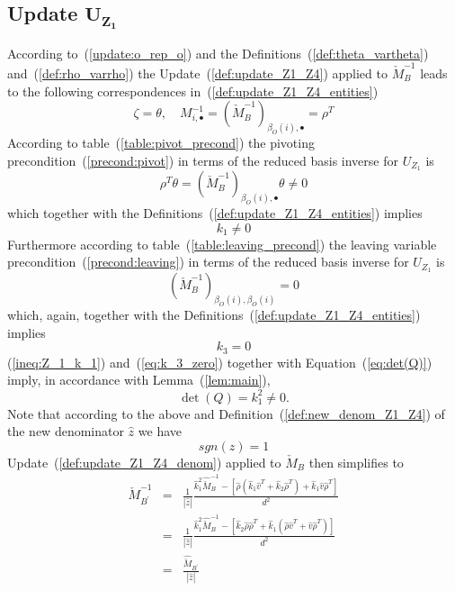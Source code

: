 \documentclass[a4paper]{article}
\begin{document}
\subsection{Update $\mathbf{U_{Z_{1}}}$}
According to~(\ref{update:o_rep_o}) and the
Definitions~(\ref{def:theta_vartheta}) 
and~(\ref{def:rho_varrho}) the
Update~(\ref{def:update_Z1_Z4}) applied to $\check{M}_{B}^{-1}$
leads to the following correspondences
in~(\ref{def:update_Z1_Z4_entities})
\begin{equation}
\zeta = \theta,
\quad
M_{i, \bullet}^{-1}
=
\left(\check{M}_{B}^{-1}\right)_{\beta_{O}(i), \bullet}
=
\rho^{T}
\end{equation}
According to table~(\ref{table:pivot_precond}) the
pivoting precondition~(\ref{precond:pivot})
in terms of the reduced basis inverse for $U_{Z_{1}}$ is
\begin{equation*}
\rho^{T}\theta
=
\left(\check{M}_{B}^{-1}\right)_{\beta_{O}(i), \bullet}\theta \neq 0
\end{equation*}
which together with the Definitions~(\ref{def:update_Z1_Z4_entities}) implies 
\begin{equation}
\label{ineq:Z_1_k_1}
k_{1} \neq 0
\end{equation}
Furthermore according to table~(\ref{table:leaving_precond})
the leaving variable precondition~(\ref{precond:leaving})
in terms of the reduced basis inverse for $U_{Z_{1}}$ is 
\begin{equation*}
\left(\check{M}_{B}^{-1}\right)_{\beta_{O}(i),\beta_{O}(i)}=0 
\end{equation*}
which, again, together with the Definitions~(\ref{def:update_Z1_Z4_entities})
implies
\begin{equation}
\label{eq:k_3_zero}
k_{3} = 0
\end{equation}
(\ref{ineq:Z_1_k_1}) and~(\ref{eq:k_3_zero}) together with
Equation~(\ref{eq:det(Q)}) imply, in accordance with Lemma~(\ref{lem:main}),  
\begin{equation}
\det(Q)=k_{1}^{2} \neq 0.
\end{equation}
Note that according to the above and
Definition~(\ref{def:new_denom_Z1_Z4}) of the new denominator
$\hat{z}$ we have
\begin{equation}
sgn(\hat{z}) = 1
\end{equation} 
Update~(\ref{def:update_Z1_Z4_denom})
applied to $\check{M}_{B}$ then simplifies to
\begin{eqnarray}
\label{def:update_Z1}
\check{M}_{B^{\prime}}^{-1}
&=&
\frac{1}{\left|\hat{z}\right|}
\frac{
\hat{k}_{1}^{2}\hat{\check{M}}_{B}^{-1}
-\left[
  \hat{\rho}
  \left(\hat{k}_{1}\hat{v}^{T} +\hat{k}_{2}\hat{\rho}^{T}\right)
  +\hat{k}_{1}\hat{v}\hat{\rho}^{T}
 \right]
}{d^{2}}
\nonumber \\
&=&
\frac{1}{\left|\hat{z}\right|}
\frac{
\hat{k}_{1}^{2}\hat{\check{M}}_{B}^{-1}
-\left[
  \hat{k}_{2}\hat{\rho}\hat{\rho}^{T}
  +\hat{k}_{1}\left(\hat{\rho}\hat{v}^{T} +\hat{v}\hat{\rho}^{T}\right)
 \right]
}{d^{2}}
\nonumber \\
&=&
\frac{\hat{\check{M}}_{B^{\prime}}}{\left|\hat{z}\right|}
\end{eqnarray}
\end{document}
